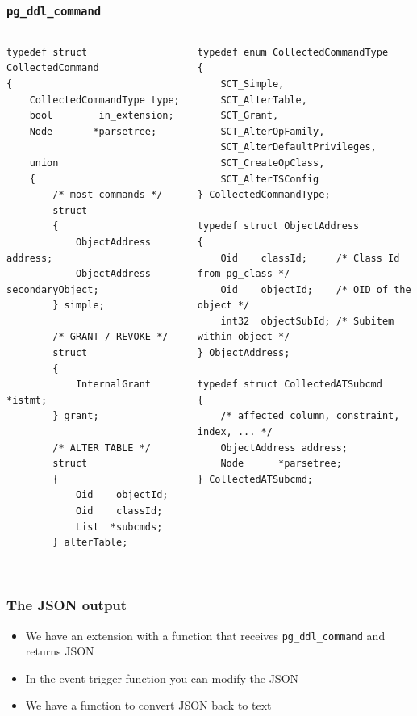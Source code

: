 \begin{frame}[fragile]
\frametitle{\texttt{pg\_ddl\_command}}

\lstset{language=C}
\tiny
\begin{columns}

\begin{column}{0.5\textwidth}
\begin{lstlisting}
typedef struct CollectedCommand
{
    CollectedCommandType type;
    bool        in_extension;
    Node       *parsetree;

    union
    {
        /* most commands */
        struct
        {
            ObjectAddress address;
            ObjectAddress secondaryObject;
        } simple;

        /* GRANT / REVOKE */
        struct
        {
            InternalGrant *istmt;
        } grant;

        /* ALTER TABLE */
        struct
        {
            Oid    objectId;
            Oid    classId;
            List  *subcmds;
        } alterTable;


\end{lstlisting}
\end{column}

\begin{column}{0.5\textwidth}
\begin{lstlisting}
typedef enum CollectedCommandType
{
    SCT_Simple,
    SCT_AlterTable,
    SCT_Grant,
    SCT_AlterOpFamily,
    SCT_AlterDefaultPrivileges,
    SCT_CreateOpClass,
    SCT_AlterTSConfig
} CollectedCommandType;

typedef struct ObjectAddress
{
    Oid    classId;     /* Class Id from pg_class */
    Oid    objectId;    /* OID of the object */
    int32  objectSubId; /* Subitem within object */
} ObjectAddress;

typedef struct CollectedATSubcmd
{
    /* affected column, constraint, index, ... */
    ObjectAddress address;
    Node      *parsetree;
} CollectedATSubcmd;

\end{lstlisting}


\end{column}


\end{columns}
\end{frame}

\frame
{ \frametitle{The JSON output}

\begin{itemize}
\item We have an extension with a function that receives \texttt{pg\_ddl\_command} and returns JSON
\item In the event trigger function you can modify the JSON
\item We have a function to convert JSON back to text
\end{itemize}
}

